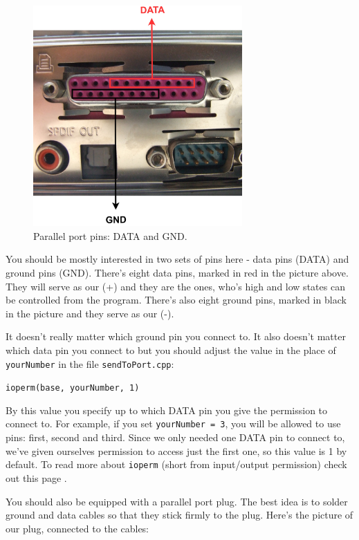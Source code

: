 \documentclass[10pt]{report}
\begin{document}
\begin{figure}[H]
\centering\includegraphics[width=8cm]{par_port}
\caption{Parallel port pins: DATA and GND.}				
\label{fig:par_port}
\end{figure}

You should be mostly interested in two sets of pins here - data pins (DATA) and ground pins (GND). There's eight data pins, marked in red in the picture above. They will serve as our (+) and they are the ones, who's high and low states can be controlled from the program. There's also eight ground pins, marked in black in the picture and they serve as our (-).

It doesn't really matter which ground pin you connect to. It also doesn't matter which data pin you connect to but you should adjust the value in the place of \verb|yourNumber| in the file \verb|sendToPort.cpp|:

\begin{snugshade}
\verb|ioperm(base, yourNumber, 1)|
\end{snugshade}

By this value you specify up to which DATA pin you give the permission to connect to. For example, if you set \verb|yourNumber = 3|, you will be allowed to use pins: first, second and third. Since we only needed one DATA pin to connect to, we've given ourselves permission to access just the first one, so this value is 1 by default. To read more about \verb|ioperm| (short from input/output permission) check out this page \cite{ioperm}.

You should also be equipped with a parallel port plug. The best idea is to solder ground and data cables so that they stick firmly to the plug. Here's the picture of our plug, connected to the cables:
\end{document}
